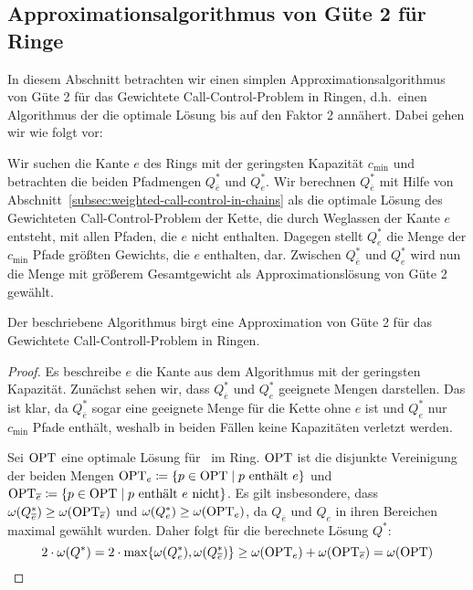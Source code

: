 \subsection{Approximationsalgorithmus von Güte 2 für Ringe}
In diesem Abschnitt betrachten wir einen simplen Approximationsalgorithmus von Güte 2 für das Gewichtete
Call-Control-Problem in Ringen, d.h.\ einen Algorithmus der die optimale Lösung bis auf den Faktor 2 annähert.
Dabei gehen wir wie folgt vor:

Wir suchen die Kante $e$ des Rings mit der geringsten Kapazität $c_{\min}$ und betrachten die beiden Pfadmengen
$Q_{\overline e}^*$ und $Q_{e}^*$.
Wir berechnen $Q_{\overline e}^*$ mit Hilfe von Abschnitt~\ref{subsec:weighted-call-control-in-chains} als die
optimale Lösung des Gewichteten Call-Control-Problem der Kette, die durch
Weglassen der Kante $e$ entsteht, mit allen Pfaden, die $e$ nicht enthalten.
Dagegen stellt $Q_e^*$ die Menge der $c_{\min}$ Pfade größten Gewichts, die $e$ enthalten, dar.
Zwischen $Q_{\overline e}^*$ und $Q_{e}^*$ wird nun die Menge mit größerem Gesamtgewicht als
Approximationslösung von Güte 2 gewählt.

\begin{theorem}
    Der beschriebene Algorithmus birgt eine Approximation von Güte 2 für das Gewichtete Call-Controll-Problem in Ringen.
\end{theorem}
\begin{proof}
    Es beschreibe $e$ die Kante aus dem Algorithmus mit der geringsten Kapazität.
    Zunächst sehen wir, dass $Q_{\overline e}^*$ und $Q_e^*$ geeignete Mengen darstellen.
    Das ist klar, da $Q_{\overline e}^*$ sogar eine geeignete Menge für die Kette ohne $e$ ist und $Q_e^*$ nur $c_{\min}$
    Pfade enthält, weshalb in beiden Fällen keine Kapazitäten verletzt werden.

    Sei $\text{OPT}$ eine optimale Lösung für \WeightedCallControl\ im Ring.
    $\text{OPT}$ ist die disjunkte Vereinigung der beiden Mengen $\text{OPT}_e \coloneqq \{p \in \text{OPT} \mid p\ \text{enthält}\ e\}$ und
    $\OPT_{\overline e} \coloneqq \{p\in\OPT\mid p\ \text{enthält}\ e\ \text{nicht}\}$.
    Es gilt insbesondere, dass $\omega(Q_{\overline e}^*) \geq \omega(\text{OPT}_{\overline e})$ und
    $\omega(Q_e^*) \geq \omega(\text{OPT}_{e})$, da $Q_{\overline e}$ und $Q_e$ in ihren Bereichen maximal gewählt wurden.
    Daher folgt für die berechnete Lösung $Q^*$:
    \[2 \cdot \omega(Q^*) = 2 \cdot  \max\{\omega(Q_e^*), \omega(Q_{\overline e}^*)\} \geq
    \omega(\text{OPT}_e) + \omega(\text{OPT}_{\overline e}) = \omega(\text{OPT}) \]
\end{proof}
